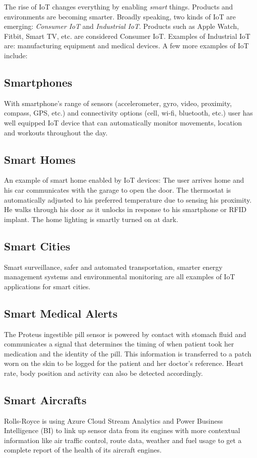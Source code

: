 \documentclass[sigconf]{acmart}
\begin{document}
The rise of IoT changes everything by enabling {\em smart} things. Products and environments are becoming smarter. Broadly speaking, two kinds of IoT are emerging: {\em Consumer IoT} and {\em Industrial IoT}. Products such as Apple Watch, Fitbit, Smart TV, etc. are considered Consumer IoT. Examples of Industrial IoT are: manufacturing equipment and medical devices. A few more examples of IoT include:

\subsection{Smartphones}
With smartphone's range of sensors (accelerometer, gyro, video, proximity, compass, GPS, etc.) and connectivity options (cell, wi-fi, bluetooth, etc.) user has well equipped IoT device that can automatically monitor movements, location and workouts throughout the day.

\subsection{Smart Homes}
An example of smart home enabled by IoT devices: The user arrives home and his car communicates with the garage to open the door. The thermostat is automatically adjusted to his preferred temperature due to sensing his proximity. He walks through his door as it unlocks in response to his smartphone or RFID implant. The home lighting is smartly turned on at dark.

\subsection{Smart Cities}
Smart surveillance, safer and automated transportation, smarter energy management systems and environmental monitoring are all examples of IoT applications for smart cities.

\subsection{Smart Medical Alerts}
The Proteus ingestible pill sensor is powered by contact with stomach fluid and communicates a signal that determines the timing of when patient took her medication and the identity of the pill. This information is transferred to a patch worn on the skin to be logged for the patient and her doctor's reference. Heart rate, body position and activity can also be detected accordingly.

\subsection{Smart Aircrafts}
Rolls-Royce is using Azure Cloud Stream Analytics and Power Business Intelligence (BI) to link up sensor data from its engines with more contextual information like air traffic control, route data, weather and fuel usage to get a complete report of the health of its aircraft engines.
\end{document}
